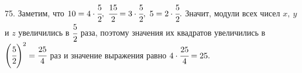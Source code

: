 75. Заметим, что $10=4\cdot\cfrac{5}{2},\ \cfrac{15}{2}=3\cdot\cfrac{5}{2},\ 5=2\cdot\cfrac{5}{2}.$ Значит, модули всех чисел $x,\ y$ и $z$ увеличились в $\cfrac{5}{2}$ раза, поэтому значения их квадратов увеличились в  $\left(\cfrac{5}{2}\right)^2=\cfrac{25}{4}$ раз и значение выражения равно $4\cdot
\cfrac{25}{4}=25.$\\
